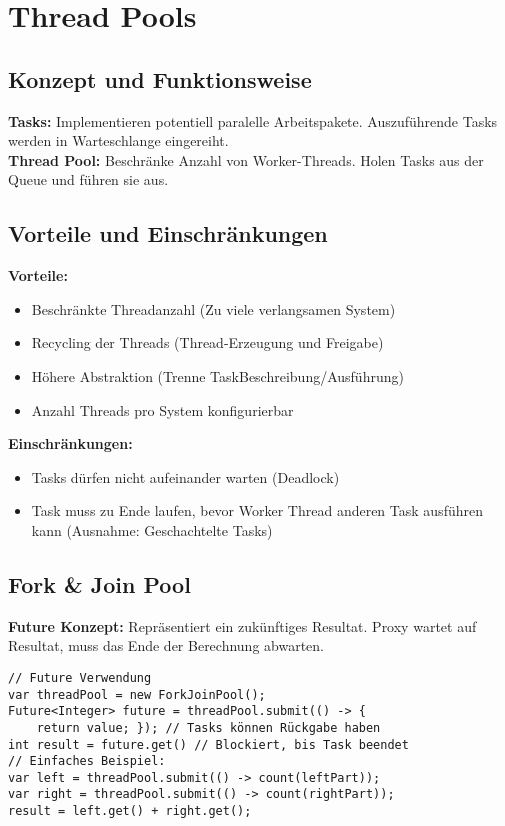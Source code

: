 
\section{Thread Pools}
\subsection{Konzept und Funktionsweise}
\textcolor{b}{\textbf{Tasks:}} Implementieren potentiell paralelle Arbeitspakete. Auszuführende Tasks werden in Warteschlange eingereiht.\\
\textcolor{b}{\textbf{Thread Pool:}} Beschränke Anzahl von Worker-Threads. Holen Tasks aus der Queue und führen sie aus.
\subsection{Vorteile und Einschränkungen}
\textcolor{b}{\textbf{Vorteile:}}
\begin{itemize}[topsep=0pt, leftmargin=3mm]
    \setlength\itemsep{-0.3em}
    \item Beschränkte Threadanzahl (Zu viele verlangsamen System)
    \item Recycling der Threads (Thread-Erzeugung und Freigabe)
    \item Höhere Abstraktion (Trenne TaskBeschreibung/Ausführung)
    \item Anzahl Threads pro System konfigurierbar
\end{itemize}
\textcolor{b}{\textbf{Einschränkungen:}}
\begin{itemize}[topsep=0pt, leftmargin=3mm]
    \setlength\itemsep{-0.3em}
    \item Tasks dürfen nicht aufeinander warten (Deadlock)
    \item Task muss zu Ende laufen, bevor Worker Thread anderen Task ausführen kann (Ausnahme: Geschachtelte Tasks)
\end{itemize}
\subsection{Fork \& Join Pool}
\textcolor{b}{\textbf{Future Konzept:}} Repräsentiert ein zukünftiges Resultat. Proxy wartet auf Resultat, muss das Ende der Berechnung abwarten.
\begin{lstlisting}
// Future Verwendung
var threadPool = new ForkJoinPool();
Future<Integer> future = threadPool.submit(() -> {
    return value; }); // Tasks können Rückgabe haben
int result = future.get() // Blockiert, bis Task beendet
// Einfaches Beispiel:
var left = threadPool.submit(() -> count(leftPart));
var right = threadPool.submit(() -> count(rightPart));
result = left.get() + right.get();
\end{lstlisting}
